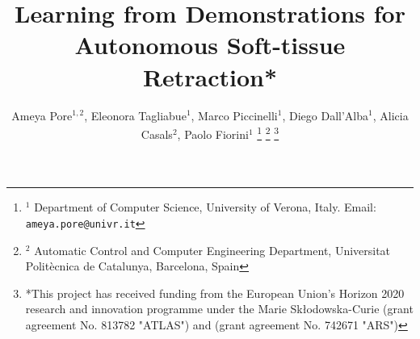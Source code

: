 \documentclass[letterpaper, 10 pt, conference]{ieeeconf}
\title{\LARGE \bf
Learning from Demonstrations for Autonomous Soft-tissue Retraction*
}
\author{Ameya Pore$^{1,2}$, Eleonora Tagliabue$^{1}$, Marco Piccinelli$^{1}$, Diego Dall'Alba$^{1}$, Alicia Casals$^{2}$, Paolo Fiorini$^{1}$ %
\thanks{$^{1}$ Department of Computer Science, University of Verona, Italy. Email: {\tt\small ameya.pore@univr.it}}%
\thanks{$^{2}$ Automatic Control and Computer Engineering Department, Universitat Politècnica de Catalunya, Barcelona, Spain }%
\thanks{*This project has received funding from the European Union’s Horizon 2020 research and innovation programme under the Marie Skłodowska-Curie (grant agreement No. 813782 "ATLAS") and (grant agreement No. 742671 "ARS")}
}
\begin{document}
\maketitle
\thispagestyle{empty}
\pagestyle{empty}



\begin{abstract}



\end{abstract}
\end{document}
